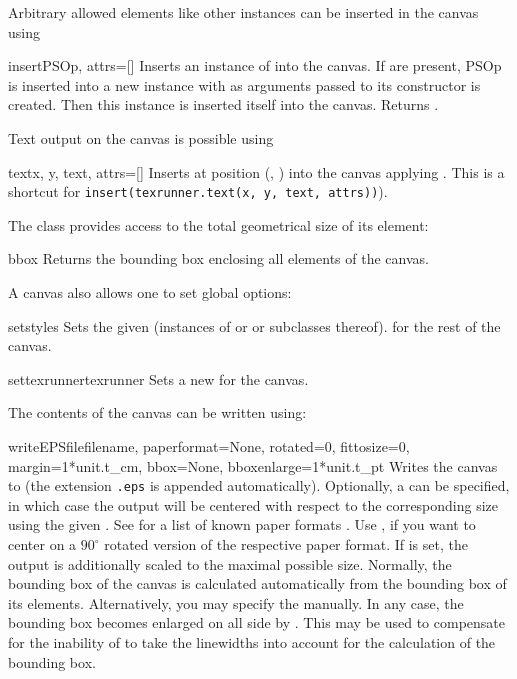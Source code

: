 Arbitrary allowed elements like other  instances can
be inserted in the canvas using

\begin{methoddesc}{insert}{PSOp, attrs=[]}
  Inserts an instance of  into the canvas.  If
   are present, PSOp is inserted into a new
  instance with  as arguments passed to its
  constructor is created. Then this  instance is
  inserted itself into the canvas. Returns .
\end{methoddesc}

Text output on the canvas is possible using

\begin{methoddesc}{text}{x, y, text, attrs=[]}
  Inserts  at position (, ) into the
  canvas applying . This is a shortcut for
  \texttt{insert(texrunner.text(x, y, text, attrs))}).
\end{methoddesc}

The  class provides access to the total geometrical size
of its element:

\begin{methoddesc}{bbox}{}
  Returns the bounding box enclosing all elements of the canvas.
\end{methoddesc}

A canvas also allows one to set global options:

\begin{methoddesc}{set}{styles}
  Sets the given  (instances of  or
   or subclasses thereof).  for the rest of
  the canvas.
\end{methoddesc}

\begin{methoddesc}{settexrunner}{texrunner}
  Sets a new  for the canvas.
\end{methoddesc}

The contents of the canvas can be written using:

\begin{methoddesc}{writeEPSfile}{filename, paperformat=None,
    rotated=0, fittosize=0, margin=1*unit.t_cm, bbox=None,
    bboxenlarge=1*unit.t_pt}
  Writes the canvas to  (the extension \texttt{.eps} is
  appended automatically). Optionally, a  can be
  specified, in which case the output will be centered with respect to
  the corresponding size using the given . See
   for a list of known paper formats .  Use
  , if you want to center on a $90^\circ$ rotated version
  of the respective paper format. If  is set, the
  output is additionally scaled to the maximal possible size.
  Normally, the bounding box of the canvas is calculated automatically
  from the bounding box of its elements.  Alternatively, you may
  specify the  manually. In any case, the bounding box
  becomes enlarged on all side by . This may be used
  to compensate for the inability of \PyX{} to take the linewidths
  into account for the calculation of the bounding box.
\end{methoddesc}

